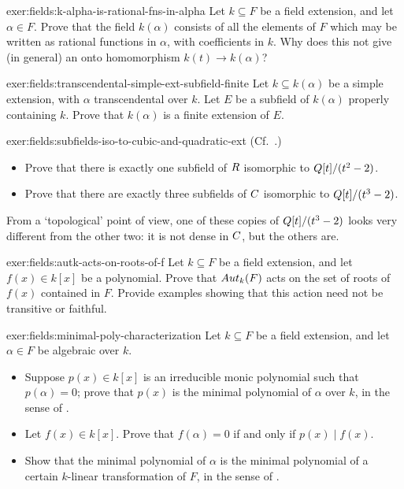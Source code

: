 \begin{exer}{}{exer:fields:k-alpha-is-rational-fns-in-alpha}
  Let $k \subseteq F$ be a field extension, and let $\alpha \in
  F$. Prove that the field $k(\alpha)$ consists of all the elements of
  $F$ which may be written as rational functions in $\alpha$, with
  coefficients in $k$.  Why does this not give (in general) an onto
  homomorphism $k(t) \to k(\alpha)$?
\end{exer}

\begin{exer}{}{exer:fields:transcendental-simple-ext-subfield-finite}
  Let $k \subseteq k(\alpha)$ be a simple extension, with $\alpha$
  transcendental over $k$. Let $E$ be a subfield of $k(\alpha)$
  properly containing $k$. Prove that $k(\alpha)$ is a finite
  extension of $E$.
\end{exer}

\begin{exer}{}{exer:fields:subfields-iso-to-cubic-and-quadratic-ext}
  (Cf.\ .)
  \begin{itemize}
  \item Prove that there is exactly one subfield of $R$ isomorphic to
    $Q[t]/(t^2 - 2)$.
  \item Prove that there are exactly three subfields of $C$
    isomorphic to $Q[t]/(t^3 - 2)$.
  \end{itemize}
  From a `topological' point of view, one of these copies of
  $Q[t]/(t^3 - 2)$ looks very different from the other two: it is not
  dense in $C$, but the others are.
\end{exer}

\begin{exer}{}{exer:fields:autk-acts-on-roots-of-f}
  Let $k \subseteq F$ be a field extension, and let $f(x) \in k[x]$ be
  a polynomial. Prove that $Aut_k(F)$ acts on the set of roots of
  $f(x)$ contained in $F$. Provide examples showing that this action
  need not be transitive or faithful.
\end{exer}

\begin{exer}{}{exer:fields:minimal-poly-characterization}
  Let $k \subseteq F$ be a field extension, and let $\alpha \in F$ be
  algebraic over $k$.
  \begin{itemize}
  \item Suppose $p(x) \in k[x]$ is an irreducible monic polynomial
    such that $p(\alpha) = 0$; prove that $p(x)$ is the minimal
    polynomial of $\alpha$ over $k$, in the sense of
    .
  \item Let $f(x) \in k[x]$. Prove that $f(\alpha) = 0$ if and only if
    $p(x) \mid f(x)$.
  \item Show that the minimal polynomial of $\alpha$ is the minimal
    polynomial of a certain $k$-linear transformation of $F$, in the
    sense of .
  \end{itemize}
\end{exer}

